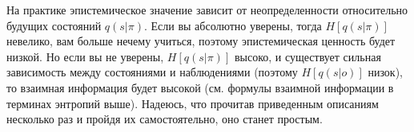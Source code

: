 \documentclass[twoside,leqno, 11pt]{article}
\begin{document}
	\begin{figure}[h]
	\end{figure}
	
	На практике эпистемическое значение зависит от неопределенности относительно будущих состояний $q(s|\pi)$. Если вы абсолютно уверены, тогда $H[q(s|\pi)]$ невелико, вам больше нечему учиться, поэтому эпистемическая ценность будет низкой. Но если вы не уверены, $H[q(s|\pi)]$ высоко, и существует сильная зависимость между состояниями и наблюдениями (поэтому $H[q(s|o)]$ низок), то взаимная информация будет высокой (см. формулы взаимной информации в терминах энтропий выше). Надеюсь, что прочитав приведенным описаниям несколько раз и пройдя их самостоятельно, оно станет простым.
	
	
\end{document}
